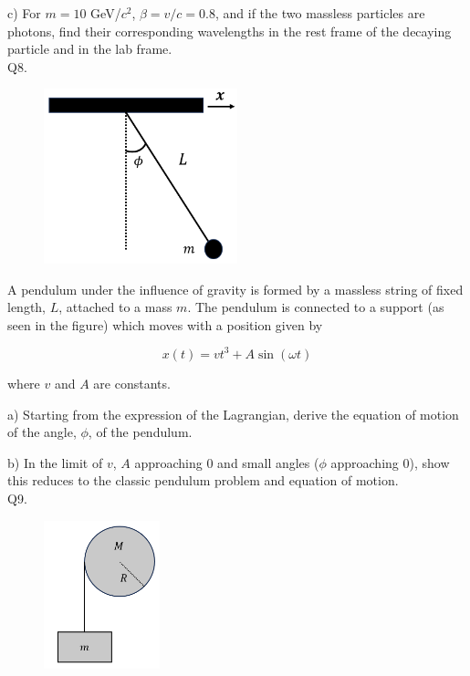 \documentclass[a4paper,11pt]{article}
\begin{document}
\medskip

\noindent c) For \( m = 10 \) GeV/\( c^{2} \), \( \beta = v/c = 0.8 \), and if the two massless particles are photons, find their corresponding wavelengths in the rest frame of the decaying particle and in the lab frame. \\

\noindent Q8. 

\begin{figure}[h!]
    \centering
    \includegraphics[width=0.5\textwidth]{CMq8figure.PNG}
    \caption*{}
\end{figure}

\noindent A pendulum under the influence of gravity is formed by a massless string of fixed length, \( L \), attached to a mass \( m \). The pendulum is connected to a support (as seen in the figure) which moves with a position given by 

\[ x(t) = v t^3 + A \sin(\omega t) \]

\noindent where \( v \) and \( A \) are constants.

\medskip

\noindent a) Starting from the expression of the Lagrangian, derive the equation of motion of the angle, \( \phi \), of the pendulum. 

\medskip

\noindent b) In the limit of \( v \), \(A\) approaching 0 and small angles (\( \phi \) approaching 0), show this reduces to the classic pendulum problem and equation of motion. \\

\noindent Q9. 

\begin{figure}[h!]
    \centering
    \includegraphics[width=0.3\textwidth]{CMq9figure.PNG}
    \caption*{}
\end{figure}
\end{document}
